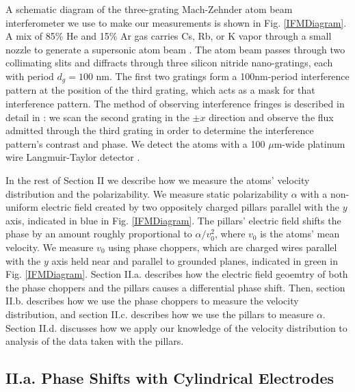 \documentclass[twocolumn,prl,showpacs,superscriptaddress]{revtex4-1}   %
\newcommand{\figref}[1]{Fig. \ref{#1}}
\begin{document}
A schematic diagram of the three-grating Mach-Zehnder atom beam interferometer we use to make our measurements is shown in \figref{IFMDiagram}. 
A mix of 85\% He and 15\% Ar gas carries Cs, Rb, or K vapor through a small nozzle to generate a supersonic atom beam \cite{Scoles} \cite{Ekstrom1993}. 
The atom beam passes through two collimating slits and diffracts through three silicon nitride nano-gratings, each with period $d_g = 100$ nm.
The first two gratings form a 100nm-period interference pattern at the position of the third grating, which acts as a mask for that interference pattern. 
The method of observing interference fringes is described in detail in \cite{Kokorowski2001}: we scan the second grating in the $\pm x$ direction and observe the flux admitted through the third grating in order to determine the interference pattern's contrast and phase.
We detect the atoms with a 100 $\mu$m-wide platinum wire Langmuir-Taylor detector \cite{Delhuille2002}.

In the rest of Section II we describe how we measure the atoms' velocity distribution and the polarizability.
We measure static polarizability $\alpha$ with a non-uniform electric field created by two oppositely charged pillars parallel with the $y$ axis, indicated in blue in \figref{IFMDiagram}. The pillars' electric field shifts the phase by an amount roughly proportional to $\alpha/v_0^2$, where $v_0$ is the atoms' mean velocity. We measure $v_0$ using phase choppers, which are charged wires parallel with the $y$ axis held near and parallel to grounded planes, indicated in green in \figref{IFMDiagram}.
Section II.a. describes how the electric field geoemtry of both the phase choppers and the pillars causes a differential phase shift. Then, section II.b. describes how we use the phase choppers to measure the velocity distribution, and section II.c. describes how we use the pillars to measure $\alpha$. Section II.d. discusses how we apply our knowledge of the velocity distribution to analysis of the data taken with the pillars.


\subsection{II.a. Phase Shifts with Cylindrical Electrodes}
\end{document}
